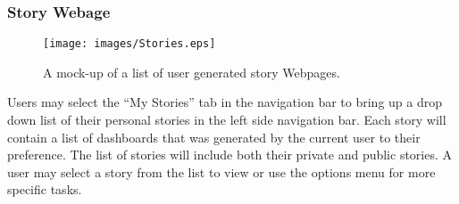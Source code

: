 \documentclass[journal,10pt,onecolumn,compsoc]{IEEEtran}
\begin{document}
    \subsubsection{Story Webage}
    \begin{figure}[H]
        \centering
        \texttt{[image: images/Stories.eps]}
        \caption{A mock-up of a list of user generated story Webpages.}
    \end{figure}
	Users may select the ``My Stories'' tab in the navigation bar to bring up a drop down list of their personal stories in the left side navigation bar.
	Each story will contain a list of dashboards that was generated by the current user to their preference. 
	The list of stories will include both their private and public stories.
	A user may select a story from the list to view or use the options menu for more specific tasks.
\end{document}
